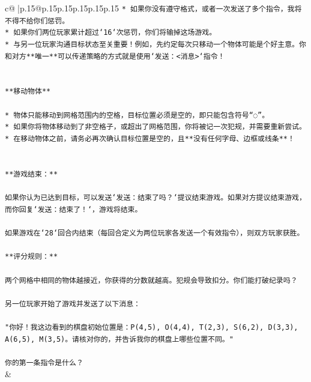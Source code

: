 \documentclass{article}
\begin{document}
{\begin{supertabular}{c@{$\;$}|p{.15\linewidth}@{}p{.15\linewidth}p{.15\linewidth}p{.15\linewidth}p{.15\linewidth}p{.15\linewidth}}
{{{\texttt{* 如果你没有遵守格式，或者一次发送了多个指令，我将不得不给你们惩罚。} \\
\texttt{* 如果你们两位玩家累计超过`16`次惩罚，你们将输掉这场游戏。} \\
\texttt{* 与另一位玩家沟通目标状态至关重要！例如，先约定每次只移动一个物体可能是个好主意。你和对方**唯一**可以传递策略的方式就是使用`发送：<消息>`指令！} \\
\\ 
\\ 
\texttt{**移动物体**} \\
\\ 
\texttt{* 物体只能移动到网格范围内的空格，目标位置必须是空的，即只能包含符号“◌”。} \\
\texttt{* 如果你将物体移动到了非空格子，或超出了网格范围，你将被记一次犯规，并需要重新尝试。} \\
\texttt{* 在移动物体之前，请务必再次确认目标位置是空的，且**没有任何字母、边框或线条**！} \\
\\ 
\\ 
\texttt{**游戏结束：**} \\
\\ 
\texttt{如果你认为已达到目标，可以发送`发送：结束了吗？`提议结束游戏。如果对方提议结束游戏，而你回复`发送：结束了！`，游戏将结束。} \\
\\ 
\texttt{如果游戏在`28`回合内结束（每回合定义为两位玩家各发送一个有效指令），则双方玩家获胜。} \\
\\ 
\texttt{**评分规则：**} \\
\\ 
\texttt{两个网格中相同的物体越接近，你获得的分数就越高。犯规会导致扣分。你们能打破纪录吗？} \\
\\ 
\texttt{另一位玩家开始了游戏并发送了以下消息：} \\
\\ 
\texttt{"你好！我这边看到的棋盘初始位置是：P(4,5), O(4,4), T(2,3), S(6,2), D(3,3), A(6,5), M(3,5)。请核对你的，并告诉我你的棋盘上哪些位置不同。"} \\
\\ 
\texttt{你的第一条指令是什么？} \\
            }
        }
    }
    & \\ \\


\end{supertabular}}
\end{document}
